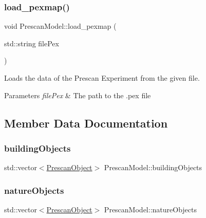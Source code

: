 \subsubsection{\texorpdfstring{load\+\_\+pexmap()}{load\_pexmap()}}
{\footnotesize\ttfamily void Prescan\+Model\+::load\+\_\+pexmap (\begin{DoxyParamCaption}\item[{std\+::string}]{file\+Pex }\end{DoxyParamCaption})\hspace{0.3cm}{\ttfamily [inline]}}



Loads the data of the Prescan Experiment from the given file. 


\begin{DoxyParams}{Parameters}
{\em file\+Pex} & The path to the .pex file \\
\hline
\end{DoxyParams}


\subsection{Member Data Documentation}
\mbox{\label{structPrescanModel_a64be71696406702451ae290cb3e33a74}} 
\subsubsection{\texorpdfstring{building\+Objects}{buildingObjects}}
{\footnotesize\ttfamily std\+::vector$<$\hyperlink{structPrescanObject}{Prescan\+Object}$>$ Prescan\+Model\+::building\+Objects}

\mbox{\label{structPrescanModel_a35c4b0fa33aec2275cc4673f19582b03}} 
\subsubsection{\texorpdfstring{nature\+Objects}{natureObjects}}
{\footnotesize\ttfamily std\+::vector$<$\hyperlink{structPrescanObject}{Prescan\+Object}$>$ Prescan\+Model\+::nature\+Objects}

\mbox{\label{structPrescanModel_aee74a3792c6451c478efcf6bfeb5da7b}} 
